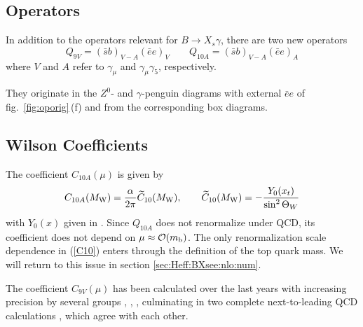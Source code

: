 \subsection{Operators}
         \label{sec:Heff:BXsee:ops}
In addition to the operators relevant for $B\to X_s\gamma$,
there are two new operators
\begin{equation}\label{Q9V}
Q_{9V}    = (\bar{s} b)_{V-A}  (\bar{e}e)_V         
\qquad
Q_{10A}  =  (\bar{s} b)_{V-A}  (\bar{e}e)_A
\end{equation}
where $V$ and $A$ refer to $\gamma_{\mu}$ and $ \gamma_{\mu}\gamma_5$,
respectively.

They originate in the $Z^0$- and $\gamma$-penguin diagrams
with external $\bar{e}e$ of fig.\ \ref{fig:oporig}\,(f) and from the
corresponding box diagrams.
\subsection{Wilson Coefficients}
         \label{sec:Heff:BXsee:wc}
The coefficient $C_{10A}(\mu)$ is given by
\begin{equation} \label{C10}
C_{10A}(M_{\rm W}) =  \frac{\alpha}{2\pi} \widetilde C_{10}(M_{\rm W}), \qquad
\widetilde C_{10}(M_{\rm W}) = - \frac{Y_0(x_t)}{\sin^2\Theta_W}
\end{equation}
with $Y_0(x)$ given in . Since $Q_{10A}$ does not renormalize
under QCD, its coefficient does not depend on $\mu\approx {\cal
O}(m_{\rm b})$. The only renormalization scale dependence in (\ref{C10})
enters through the definition of the top quark mass. We will return to
this issue in section \ref{sec:Heff:BXsee:nlo:num}.

The coefficient $C_{9V}(\mu)$ has been calculated over the last years
with increasing precision by several groups \cite{grinstein:89a},
\cite{GDSN:89}, \cite{cellaetal:91}, \cite{misiak:93} culminating in two
complete next-to-leading QCD calculations \cite{misiak:94},
\cite{burasmuenz:95} which agree with each other.

